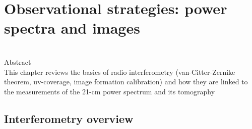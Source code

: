 \chapter{Observational strategies: power spectra and images}

\begin{bf}
  \author{Gianni Bernardi (INAF-IRA \& Rhodes University)}\\
  
Abstract\\

This chapter reviews the basics of radio interferometry (van-Citter-Zernike theorem, uv-coverage, image formation calibration) and how they are linked to the measurements of the 21-cm power spectrum and its tomography 
\end{bf}



\section{Interferometry overview}

